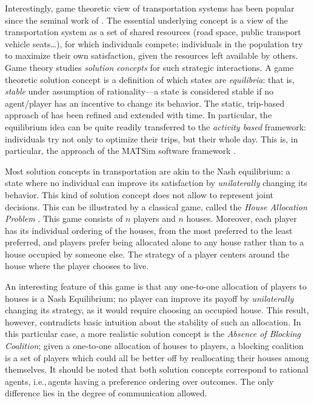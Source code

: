 {Interestingly, game theoretic view of transportation systems has been popular since the seminal work of \citet{Wardrop_PICE_1952}. The essential underlying concept is a view of the transportation system as a set of shared resources (road space, public transport vehicle seats\ldots), for which individuals compete; individuals in the population try to maximize their own satisfaction, given the resources left available by others. Game theory studies \emph{solution concepts} for such strategic interactions. A game theoretic solution concept is a definition of which states are \emph{equilibria}: that is, \emph{stable} under assumption of rationality---a state is considered stable if no agent/player has an incentive to change its behavior. The static, trip-based approach of \citet{Wardrop_PICE_1952} has been refined and extended with time. In particular, the equilibrium idea can be quite readily transferred to the \emph{activity based} framework: individuals try not only to optimize their trips, but their whole day. This is, in particular, the approach of the MATSim software framework \citep{Axhausen_SSRL_2006,NagelFloetteroed_IATBR_2009}.

Most solution concepts in transportation are akin to the Nash equilibrium: a state where no individual can improve its satisfaction by \emph{unilaterally} changing its behavior. This kind of solution concept does not allow to represent joint decisions. This can be illustrated by a classical game, called the \emph{House Allocation Problem} \citep{SchummerVohra_NisanEtAl_2007}. This game consists of $n$ players and $n$ houses. Moreover, each player has its individual ordering of the houses, from the most preferred to the least preferred, and players prefer being allocated alone to any house rather than to a house occupied by someone else. The strategy of a player centers around the house where the player chooses to live.

An interesting feature of this game is that any one-to-one allocation of players to houses is a Nash Equilibrium; no player can improve its payoff by \emph{unilaterally} changing its strategy, as it would require choosing an occupied house. This result, however, contradicts basic intuition about the stability of such an allocation. In this particular case, a more realistic solution concept is the \emph{Absence of Blocking Coalition}; given a one-to-one allocation of houses to players, a blocking coalition is a set of players which could all be better off by reallocating their houses among themselves. It should be noted that both solution concepts correspond to rational agents, i.e.,\,agents having a preference ordering over outcomes. The only difference lies in the degree of communication allowed.

}
